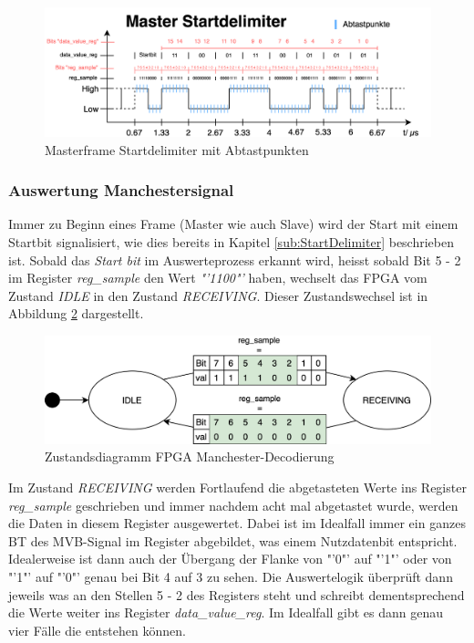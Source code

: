 \begin{figure}[H]
    \centering
    \includegraphics[width=1\linewidth]{Figures/Chap3/FPGA/Abtastpunkte_Master.png}
    \caption{Masterframe Startdelimiter mit Abtastpunkten}
    \label{fig:MasterframeAbtastung}
\end{figure}

\subsubsection{Auswertung Manchestersignal}
\label{Auswertung Manchestersignal}
Immer zu Beginn eines Frame (Master wie auch Slave) wird der Start mit einem Startbit signalisiert, wie dies bereits in Kapitel \ref{sub:StartDelimiter} beschrieben ist.
Sobald das \textit{Start bit} im Auswerteprozess erkannt wird, heisst sobald Bit 5 - 2 im Register \textit{reg\_sample} den Wert \textit{"'1100"'} haben, wechselt das FPGA vom Zustand \textit{IDLE} in den Zustand \textit{RECEIVING}. Dieser Zustandswechsel ist in Abbildung \ref{fig:FPGAIdleRec} dargestellt.

\begin{figure}[H]
    \centering
    \includegraphics[width=0.7\linewidth]{Figures//Chap3//FPGA/FPGA_idle_rec.png}
    \caption{Zustandsdiagramm FPGA Manchester-Decodierung}
    \label{fig:FPGAIdleRec}
\end{figure}

Im Zustand \textit{RECEIVING} werden Fortlaufend die abgetasteten Werte ins Register 
\textit{reg\_sample} geschrieben und immer nachdem acht mal abgetastet wurde, werden die Daten in diesem Register ausgewertet. Dabei ist im Idealfall immer ein ganzes BT des MVB-Signal im Register abgebildet, was einem Nutzdatenbit entspricht. Idealerweise ist dann auch der Übergang der Flanke von "'0"' auf "'1"' oder von "'1"' auf "'0"' genau bei Bit 4 auf 3 zu sehen. Die Auswertelogik überprüft dann jeweils was an den Stellen 5 - 2 des Registers steht und schreibt dementsprechend die Werte weiter ins Register \textit{data\_value\_reg}. Im Idealfall gibt es dann genau vier Fälle die entstehen können.


